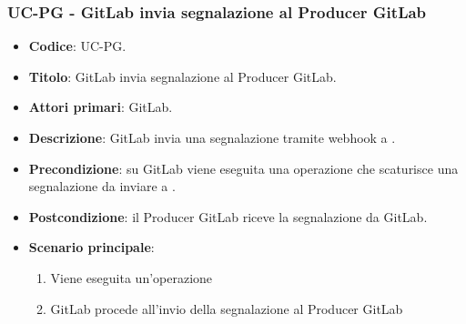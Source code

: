 \subsubsection{UC\theuccount-PG - GitLab invia segnalazione al Producer GitLab}
\begin{itemize}
    \item \textbf{Codice}: UC\theuccount-PG.
    \item \textbf{Titolo}: GitLab invia segnalazione al Producer GitLab.
    \item \textbf{Attori primari}: GitLab.
    \item \textbf{Descrizione}: GitLab invia una segnalazione tramite webhook a \progetto.
    \item \textbf{Precondizione}: su GitLab viene eseguita una operazione che scaturisce una
    segnalazione da inviare a \progetto.
    \item \textbf{Postcondizione}: il Producer GitLab riceve la segnalazione da GitLab.
    \item \textbf{Scenario principale}: 
    \begin{enumerate}
        \item Viene eseguita un'operazione
        \item GitLab procede all'invio della segnalazione al Producer GitLab
    \end{enumerate}
    
\end{itemize}


